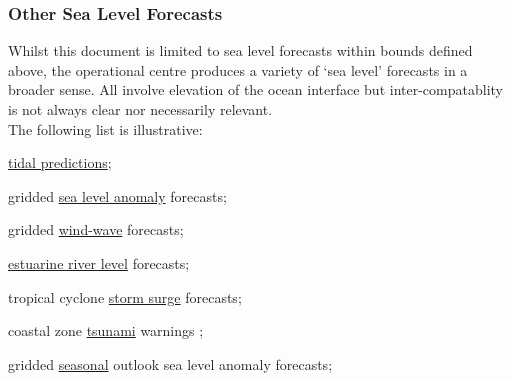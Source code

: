 \subsubsection{Other Sea Level Forecasts}  
Whilst this document is limited to sea level forecasts within bounds defined above, the operational centre produces a variety of `sea level' forecasts in a broader sense.  All involve elevation of the ocean interface but inter-compatablity is not always clear nor necessarily relevant.  \\
The following list is illustrative:
\begin{inparaenum}[(a)]
\item \underline{tidal predictions}; %
\item gridded \underline{sea level anomaly} forecasts; %
\item gridded \underline{wind-wave} forecasts; %
\item \underline{estuarine river level} forecasts; %
\item tropical cyclone \underline{storm surge} forecasts; %
\item coastal zone \underline{tsunami} warnings ;%
\item gridded \underline{seasonal} outlook sea level anomaly forecasts;
\end{inparaenum}




